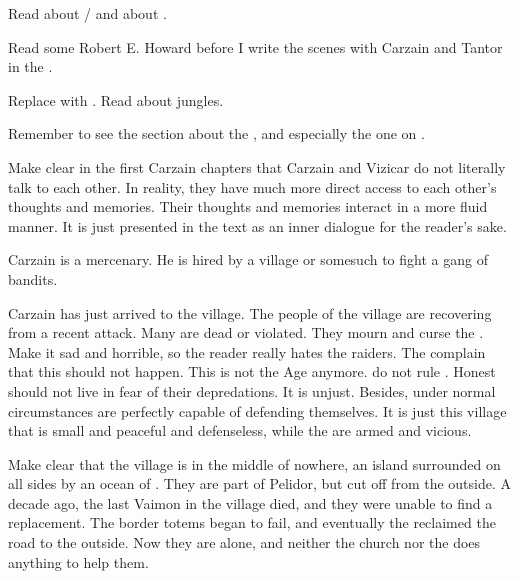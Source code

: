 
Read about / and about . 

Read some Robert E. Howard before I write the scenes with Carzain and Tantor in the \wylde. 
    
Replace  with . 
Read about jungles. 

Remember to see the section about the , and especially the one on . 
    
Make clear in the first Carzain chapters that Carzain and Vizicar do not literally talk to each other. 
In reality, they have much more direct access to each other's thoughts and memories. 
Their thoughts and memories interact in a more fluid manner. 
It is just presented in the text as an inner dialogue for the reader's sake.

Carzain is a mercenary. 
He is hired by a village or somesuch to fight a gang of bandits. 

\begin{comment}
  \section{The village}
\end{comment}

Carzain has just arrived to the village.
The people of the village are recovering from a recent attack.
Many are dead or violated.
They mourn and curse the \humans.
Make it sad and horrible, so the reader really hates the raiders.
The \scathae complain that this should not happen.
This is not the \Human Age anymore. 
\Humans do not rule \Miith.
Honest \scathae should not live in fear of their depredations.
It is unjust.
Besides, under normal circumstances \scathae are perfectly capable of defending themselves.
It is just this village that is small and peaceful and defenseless, while the \humans are armed and vicious.

Make clear that the village is in the middle of nowhere, an island surrounded on all sides by an ocean of \wylde.
They are part of Pelidor, but cut off from the outside.
A decade ago, the last Vaimon in the village died, and they were unable to find a replacement.
The border totems began to fail, and eventually the \wylde reclaimed the road to the outside.
Now they are alone, and neither the church nor the \rayuth does anything to help them.

